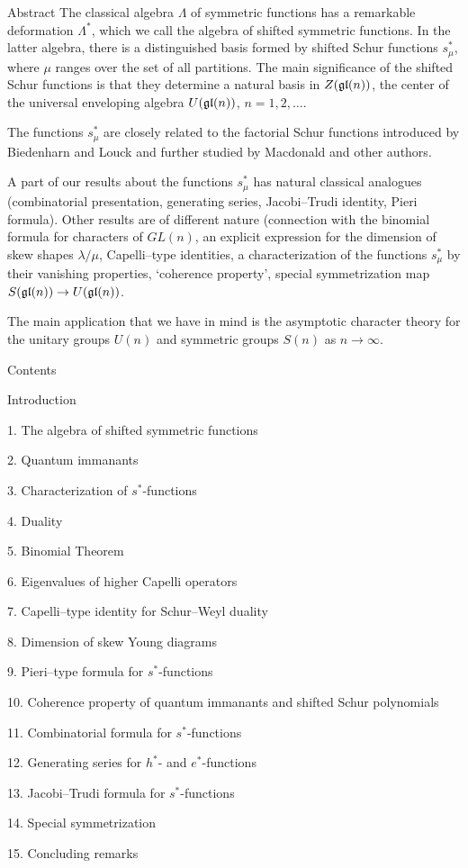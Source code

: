 \head Abstract \endhead
The classical algebra $\Lambda$ of symmetric functions has a remarkable
deformation $\Lambda^*$, which we call the algebra of shifted symmetric
functions. In the latter algebra, there is a distinguished basis formed by
shifted Schur functions $s^*_\mu$, where $\mu$ ranges over the set of
all partitions. The main significance of the shifted Schur functions is
that they determine a natural basis in $Z(\frak{gl}(n))$, the center of the
universal enveloping algebra $U(\frak{gl}(n))$, $n=1,2,\ldots$. 

The functions $s^*_\mu$ are closely related to the factorial Schur
functions introduced by Biedenharn and Louck and further studied by
Macdonald and other authors.

A part of our results about the functions $s^*_\mu$ has natural classical
analogues (combinatorial presentation, generating series, Jacobi--Trudi
identity, Pieri formula). Other results are of different nature
(connection with the binomial formula for characters of $GL(n)$, an
explicit expression for the dimension of skew shapes $\lambda/\mu$,
Capelli--type identities, a characterization of the functions $s^*_\mu$ by
their vanishing properties, `coherence property', special
symmetrization map $S(\frak{gl}(n))\to U(\frak{gl}(n))$.

The main application that we have in mind is the asymptotic
character theory for the unitary groups $U(n)$ and 
symmetric groups $S(n)$ as $n\to\infty$. 


\newpage
\head Contents\endhead

Introduction\par
\item{1.} The algebra of shifted symmetric functions
\item{2.} Quantum immanants
\item{3.} Characterization of $s^*$-functions
\item{4.} Duality
\item{5.} Binomial Theorem
\item{6.} Eigenvalues of higher Capelli operators
\item{7.} Capelli--type identity for Schur--Weyl duality
\item{8.} Dimension of skew Young diagrams
\item{9.} Pieri--type formula for $s^*$-functions
\item{10.} Coherence property of quantum immanants and shifted Schur
polynomials 
\item{11.} Combinatorial formula for $s^*$-functions
\item{12.} Generating series for $h^*$- and $e^*$-functions
\item{13.} Jacobi--Trudi formula for $s^*$-functions
\item{14.} Special symmetrization
\item{15.} Concluding remarks

